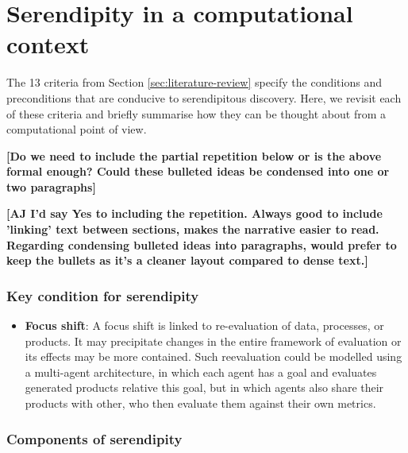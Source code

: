 \section{Serendipity in a computational context} \label{sec:computational-serendipity}

The 13 criteria from Section \ref{sec:literature-review}
specify the conditions and preconditions that are conducive to
serendipitous discovery.  Here, we revisit each of these criteria and
briefly summarise how they can be thought about from a computational
point of view.

\textbf{[Do we need to include the partial repetition below or is the
    above formal enough?  Could these bulleted ideas be condensed into
    one or two paragraphs]}

\textbf{[AJ I'd say Yes to including the repetition. Always good to include 'linking’ text between sections, makes the narrative easier to read. Regarding condensing bulleted ideas into paragraphs, would prefer to keep the bullets as it's a cleaner layout compared to dense text.]}

\subsubsection*{Key condition for serendipity}

\begin{itemize}
\item \textbf{Focus shift}: A focus shift is linked to re-evaluation
  of data, processes, or products.  It may precipitate changes in the
  entire framework of evaluation or its effects may be more contained.
  Such reevaluation could be modelled using a multi-agent
  architecture, in which each agent has a goal and evaluates generated
  products relative this goal, but in which agents also share their
  products with other, who then evaluate them against their own
  metrics.
\end{itemize}

\subsubsection*{Components of serendipity}

